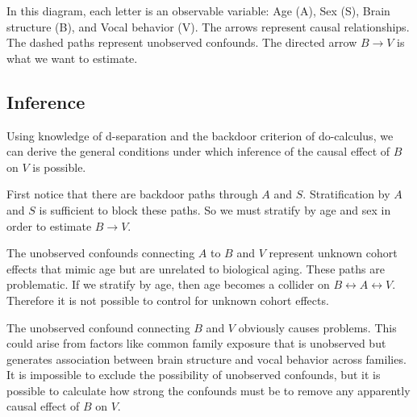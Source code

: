\documentclass[reqno ,11pt]{amsart}
\begin{document}
\begin{center}
\end{center}
In this diagram, each letter is an observable variable: Age (A), Sex (S), Brain structure (B), and Vocal behavior (V). The arrows represent causal relationships. The dashed paths represent unobserved confounds. The directed arrow $B \rightarrow V$ is what we want to estimate. 

\subsection{Inference}

Using knowledge of d-separation and the backdoor criterion of do-calculus, we can derive the general conditions under which inference of the causal effect of $B$ on $V$ is possible.

First notice that there are backdoor paths through $A$ and $S$. Stratification by $A$ and $S$ is sufficient to block these paths. So we must stratify by age and sex in order to estimate $B \rightarrow V$. 

The unobserved confounds connecting $A$ to $B$ and $V$ represent unknown cohort effects that mimic age but are unrelated to biological aging. These paths are problematic. If we stratify by age, then age becomes a collider on $B \longleftrightarrow A \longleftrightarrow V$. Therefore it is not possible to control for unknown cohort effects.

The unobserved confound connecting $B$ and $V$ obviously causes problems. This could arise from factors like common family exposure that is unobserved but generates association between brain structure and vocal behavior across families. It is impossible to exclude the possibility of unobserved confounds, but it is possible to calculate how strong the confounds must be to remove any apparently causal effect of $B$ on $V$.
\end{document}
